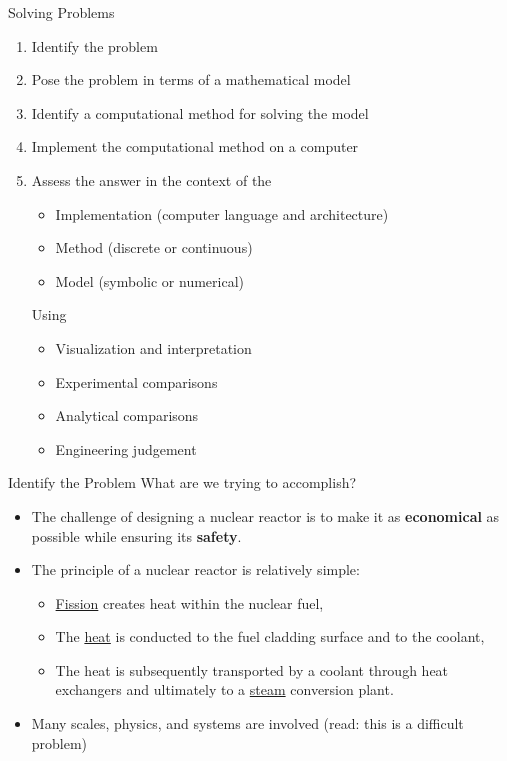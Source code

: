 \documentclass[xcolor=x11names]{beamer}
\begin{document}
\begin{frame}{Solving Problems}
\begin{enumerate}
\item Identify the problem
\item Pose the problem in terms of a mathematical model
\item Identify a computational method for solving the model
\item Implement the computational method on a computer
\item Assess the answer in the context of the
\begin{itemize}
\item Implementation (computer language and architecture)
\item Method (discrete or continuous)
\item Model (symbolic or numerical)
\end{itemize}
Using
\begin{itemize}
\item Visualization and interpretation
\item Experimental comparisons
\item Analytical comparisons
\item Engineering judgement
\end{itemize}
\end{enumerate}
\end{frame}


\begin{frame}{Identify the Problem}
What are we trying to accomplish?
\begin{itemize}
\item The challenge of designing a nuclear reactor is to make it as \textbf{economical} as possible while ensuring its \textbf{safety}. \vspace*{1 em}

\pause
\item The principle of a nuclear reactor is relatively simple:
\begin{itemize}
\item \underline{Fission} creates heat within the nuclear fuel,
\item The \underline{heat} is conducted to the fuel cladding surface and to the coolant,
\item The heat is subsequently transported by a coolant through heat exchangers and ultimately to a \underline{steam} conversion plant.
\end{itemize}
\vspace*{1 em}

\pause
\item Many scales, physics, and systems are involved (read: this is a difficult
      problem)
\end{itemize}
\end{frame}
\end{document}
